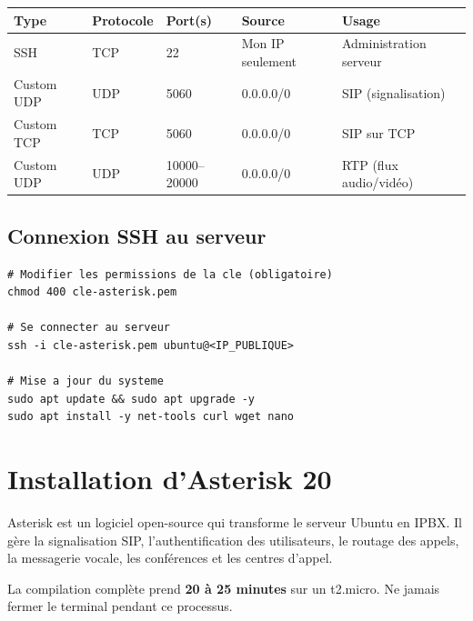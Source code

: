 \documentclass[a4paper,11pt]{report}
\begin{document}
\begin{center}
\begin{tabular}{lllll}
\toprule
\rowcolor{primarylight}\textbf{Type} & \textbf{Protocole} & \textbf{Port(s)} & \textbf{Source} & \textbf{Usage}\\
\midrule
SSH & TCP & 22 & Mon IP seulement & Administration serveur\\
Custom UDP & UDP & 5060 & 0.0.0.0/0 & SIP (signalisation)\\
Custom TCP & TCP & 5060 & 0.0.0.0/0 & SIP sur TCP\\
Custom UDP & UDP & 10000--20000 & 0.0.0.0/0 & RTP (flux audio/vidéo)\\
\bottomrule
\end{tabular}
\end{center}

\section{Connexion SSH au serveur}

\begin{codebox}
\begin{lstlisting}
# Modifier les permissions de la cle (obligatoire)
chmod 400 cle-asterisk.pem

# Se connecter au serveur
ssh -i cle-asterisk.pem ubuntu@<IP_PUBLIQUE>

# Mise a jour du systeme
sudo apt update && sudo apt upgrade -y
sudo apt install -y net-tools curl wget nano
\end{lstlisting}
\end{codebox}

\chapter{Installation d'Asterisk 20}

\begin{infobox}
Asterisk est un logiciel open-source qui transforme le serveur Ubuntu en IPBX. Il gère la signalisation SIP, l'authentification des utilisateurs, le routage des appels, la messagerie vocale, les conférences et les centres d'appel.
\end{infobox}

\begin{warningbox}
La compilation complète prend \textbf{20 à 25 minutes} sur un t2.micro. Ne jamais fermer le terminal pendant ce processus.
\end{warningbox}
\end{document}
